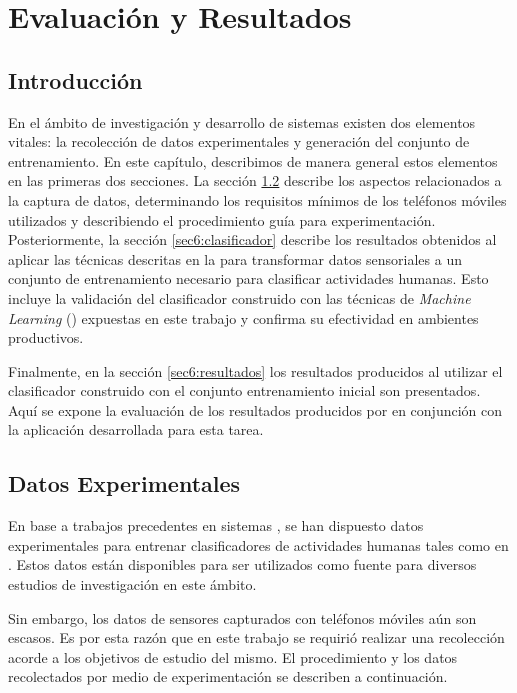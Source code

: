 
\chapter{Evaluación y Resultados}

\label{chap6:evaluacion}

\section{Introducción}

\label{sec6:introduccion}En el ámbito de investigación y desarrollo
de sistemas  existen dos elementos vitales: la recolección
de datos experimentales y generación del conjunto de entrenamiento.
En este capítulo, describimos de manera general estos elementos en
las primeras dos secciones. La sección \ref{sec6:datos-exp} describe
los aspectos relacionados a la captura de datos, determinando los
requisitos mínimos de los teléfonos móviles utilizados y describiendo
el procedimiento guía para experimentación. Posteriormente, la sección
\ref{sec6:clasificador} describe los resultados obtenidos al aplicar
las técnicas descritas en la  para
transformar datos sensoriales a un conjunto de entrenamiento necesario
para clasificar actividades humanas. Esto incluye la validación del
clasificador construido con las técnicas de \emph{Machine Learning}
() expuestas en este trabajo y confirma su efectividad en
ambientes productivos. 

Finalmente, en la sección \ref{sec6:resultados} los resultados producidos
al utilizar el clasificador construido con el conjunto entrenamiento
inicial son presentados. Aquí se expone la evaluación de los resultados
producidos por \emph{ }en conjunción con la aplicación
\emph{} desarrollada para esta tarea.

\section{Datos Experimentales}

\label{sec6:datos-exp}En base a trabajos precedentes en sistemas
, se han dispuesto datos experimentales para entrenar clasificadores
de actividades humanas tales como en \cite{ReyesOrtiz2013}. Estos
datos están disponibles para ser utilizados como fuente para diversos
estudios de investigación en este ámbito. 

Sin embargo, los datos de sensores capturados con teléfonos móviles
aún son escasos. Es por esta razón que en este trabajo se requirió
realizar una recolección acorde a los objetivos de estudio del mismo.
El procedimiento y los datos recolectados por medio de experimentación
se describen a continuación.

